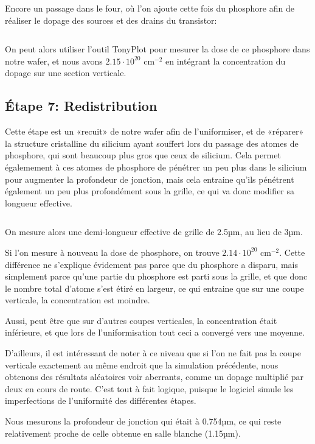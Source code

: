 \documentclass{article}
\begin{document}
Encore un passage dans le four, où l’on ajoute cette fois du phosphore afin de réaliser le dopage des sources et des drains du transistor:
\inputminted[linenos,firstnumber=61,firstline=61,lastline=69]{sh}{final_named.in}

On peut alors utiliser l’outil TonyPlot pour mesurer la dose de ce phosphore dans notre wafer, et nous avons $2.15\cdot10^{20}$ cm$^{-2}$ en intégrant la concentration du dopage sur une section verticale.

\subsection{Étape 7: Redistribution}
Cette étape est un «recuit» de notre wafer afin de l’uniformiser, et de «réparer» la structure cristalline du silicium ayant souffert lors du passage des atomes de phosphore, qui sont beaucoup plus gros que ceux de silicium. Cela permet égalemement à ces atomes de phosphore de pénétrer un peu plus dans le silicium pour augmenter la profondeur de jonction, mais cela entraine qu’ils pénétrent également un peu plus profondément sous la grille, ce qui va donc modifier sa longueur effective.

\inputminted[linenos,firstnumber=70,firstline=70,lastline=74]{sh}{final_named.in}

On mesure alors une demi-longueur effective de grille de 2.5µm, au lieu de 3µm.

Si l’on mesure à nouveau la dose de phosphore, on trouve $2.14\cdot10^{20}$ cm$^{-2}$. Cette différence ne s’explique évidement pas parce que du phosphore a disparu, mais simplement parce qu’une partie du phosphore est parti sous la grille, et que donc le nombre total d’atome s’est étiré en largeur, ce qui entraine que sur une coupe verticale, la concentration est moindre.

Aussi, peut être que sur d’autres coupes verticales, la concentration était inférieure, et que lors de l’uniformisation tout ceci a convergé vers une moyenne.

D’ailleurs, il est intéressant de noter à ce niveau que si l’on ne fait pas la coupe verticale exactement au même endroit que la simulation précédente, nous obtenons des résultats aléatoires voir aberrants, comme un dopage multiplié par deux en cours de route. C’est tout à fait logique, puisque le logiciel simule les imperfections de l’uniformité des différentes étapes.

Nous mesurons la profondeur de jonction qui était à 0.754µm, ce qui reste relativement proche de celle obtenue en salle blanche (1.15µm).
\end{document}

